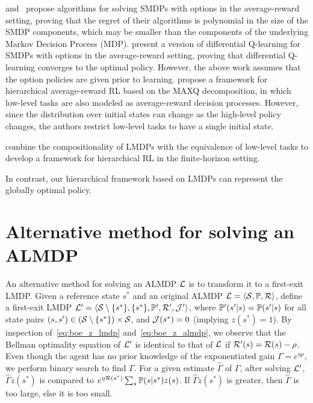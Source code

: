 \citet{Fruit2017} and~\cite{Fruit2017b} propose algorithms for solving SMDPs with options in the average-reward setting, proving that the regret of their algorithms is polynomial in the size of the SMDP components, which may be smaller than the components of the underlying Markov Decision Process (MDP).
\citet{Wan2021a} present a version of differential Q-learning for SMDPs with options in the average-reward setting, proving that differential Q-learning converges to the optimal policy.
However, the above work assumes that the option policies are given prior to learning.
\citet{Ghavamzadeh2007} propose a framework for hierarchical average-reward RL based on the MAXQ decomposition, in which low-level tasks are also modeled as average-reward decision processes.
However, since the distribution over initial states can change as the high-level policy changes, the authors restrict low-level tasks to have a single initial state.

\citet{Infante2022} combine the compositionality of LMDPs with the equivalence of low-level tasks to develop a framework for hierarchical RL in the finite-horizon setting.

In contrast, our hierarchical framework based on LMDPs can represent the globally optimal policy.

\section{Alternative method for solving an ALMDP}

An alternative method for solving an ALMDP $\mathcal{L}$ is to transform it to a first-exit LMDP. 
Given a reference state $s^*$ and an original ALMDP $\mathcal{L}=\langle\mathcal{S},\mathbb{P},\mathcal{R}\rangle$, define a first-exit LMDP $\mathcal{L}'=\langle\mathcal{S}\setminus\{s^*\},\{s^*\}, \mathbb{P}',\mathcal{R}',\mathcal{J}'\rangle$, where $\mathbb{P}'(s'|s)=\mathbb{P}(s'|s)$ for all state pairs $(s,s')\in(\mathcal{S}\setminus\{s^*\})\times\mathcal{S}$, and $\mathcal{J}(s^*)=0$ (implying $z(s^*)=1$). By inspection of~\eqref{eq:boe_z_lmdp} and~\eqref{eq:boe_z_almdp}, we observe that the Bellman optimality equation of $\mathcal{L}'$ is identical to that of $\mathcal{L}$ if $\mathcal{R}'(s)=\mathcal{R}(s)-\rho$. Even though the agent has no prior knowledge of the exponentiated gain $\Gamma = e^{\eta\rho}$, we perform binary search to find $\Gamma$. For a given estimate $\widehat\Gamma$ of $\Gamma$, after solving $\mathcal{L}'$, $\widehat \Gamma z(s^*)$ is compared to $e^{\eta\mathcal{R}(s^*)}\sum_s\mathbb{P}(s|s^*)z(s)$. If $\widehat \Gamma z(s^*)$ is greater, then $\widehat\Gamma$ is too large, else it is too small.

